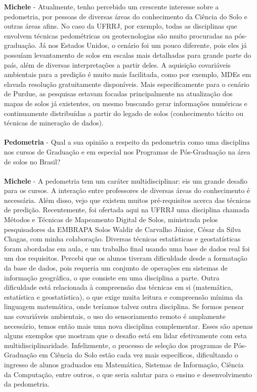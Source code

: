 \textbf{Michele} - Atualmente, tenho percebido um crescente interesse sobre a pedometria, por pessoas de diversas áreas do conhecimento da Ciência do Solo e outras áreas afins. No caso da UFRRJ, por exemplo, todas as disciplinas que envolvem técnicas pedométricas ou geotecnologias são muito procuradas na pós-graduação. Já nos Estados Unidos, o cenário foi um pouco diferente, pois eles já possuíam levantamento de solos em escalas mais detalhadas para grande parte do país, além de diversas interpretações a partir deles. A aquisição covariáveis ambientais para a predição é muito mais facilitada, como por exemplo, MDEs em elavada resolução gratuitamente disponíveis. Mais especificamente para o cenário de Purdue, as pesquisas estavam focadas principalmente na atualização dos mapas de solos já existentes, ou mesmo buscando gerar informações numéricas e continuamente distribuídas a partir do legado de solos (conhecimento tácito ou técnicas de mineração de dados).\\
\\
\textbf{Pedometria} - Qual a sua opinião a respeito da pedometria como uma disciplina nos cursos de Graduação e em especial nos Programas de Pós-Graduação na área de solos no Brasil?\\
\\
\textbf{Michele} - A pedometria tem um caráter multidisciplinar: eis um grande desafio para os cursos. A interação entre professores de diversas áreas do conhecimento é necessária. Além disso, vejo que existem muitos pré-requisitos acerca das técnicas de predição. Recentemente, foi ofertada aqui na UFRRJ uma disciplina chamada Métodos e Técnicas de Mapeamento Digital de Solos, ministrada pelos pesquisadores da EMBRAPA Solos Waldir de Carvalho Júnior, César da Silva Chagas, com minha colaboração. Diversas técnicas estatísticas e geostatísticas foram abordadas em aula, e um trabalho final usando uma base de dados real foi um dos requisitos. Percebi que os alunos tiveram dificuldade desde a formatação da base de dados, pois requeria um conjunto de operações em sistemas de informação geográfica, o que consiste em uma disciplina a parte. Outra dificuldade está relacionada à compreensão das técnicas em si (matemática, estatística e geostatística), o que exige muita leitura e compreensão mínima da linguagem 
matemática, onde teríamos talvez outra disciplina. Se formos pensar nas covariáveis ambientais, o uso do sensoriamento remoto é amplamente necessário, temos então mais uma nova disciplina complementar. Esses são apenas alguns exemplos que mostram que o desafio está em lidar efetivamente com esta multidisciplinaridade. Infelizmente, o processo de seleção dos programas de Pós-Graduação em Ciência do Solo estão cada vez mais específicos, dificultando o ingresso de alunos graduados em Matemática, Sistemas de Informação, Ciência da Computação, entre outros, o que seria salutar para o ensino e desenvolvimento da pedometria.\\
